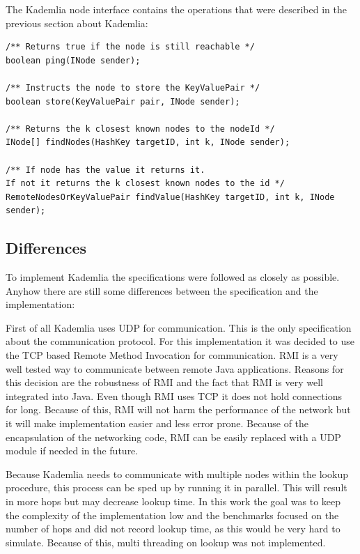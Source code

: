\documentclass[a4paper, 12pt]{article} %
\begin{document}
The Kademlia node interface contains the operations that were described in the previous section about Kademlia:  

\begin{verbatim}
/** Returns true if the node is still reachable */
boolean ping(INode sender);

/** Instructs the node to store the KeyValuePair */
boolean store(KeyValuePair pair, INode sender);

/** Returns the k closest known nodes to the nodeId */
INode[] findNodes(HashKey targetID, int k, INode sender);

/** If node has the value it returns it. 
If not it returns the k closest known nodes to the id */
RemoteNodesOrKeyValuePair findValue(HashKey targetID, int k, INode sender);
\end{verbatim}

\subsection{Differences}

To implement Kademlia the specifications were followed as closely as possible. Anyhow there are still some differences between the specification and the implementation:

First of all Kademlia uses UDP for communication. This is the only specification about the communication protocol. For this implementation it was decided to use the TCP based Remote Method Invocation for communication. RMI is a very well tested way to communicate between remote Java applications. Reasons for this decision are the robustness of RMI and the fact that RMI is very well integrated into Java. Even though RMI uses TCP it does not hold connections for long. Because of this, RMI will not harm the performance of the network but it will make implementation easier and less error prone. Because of the encapsulation of the networking code, RMI can be easily replaced with a UDP module if needed in the future.

Because Kademlia needs to communicate with multiple nodes within the lookup procedure, this process can be sped up by running it in parallel. This will result in more hops but may decrease lookup time. In this work the goal was to keep the complexity of the implementation low and the benchmarks focused on the number of hops and did not record lookup time, as this would be very hard to simulate. Because of this, multi threading on lookup was not implemented. 
\end{document}
